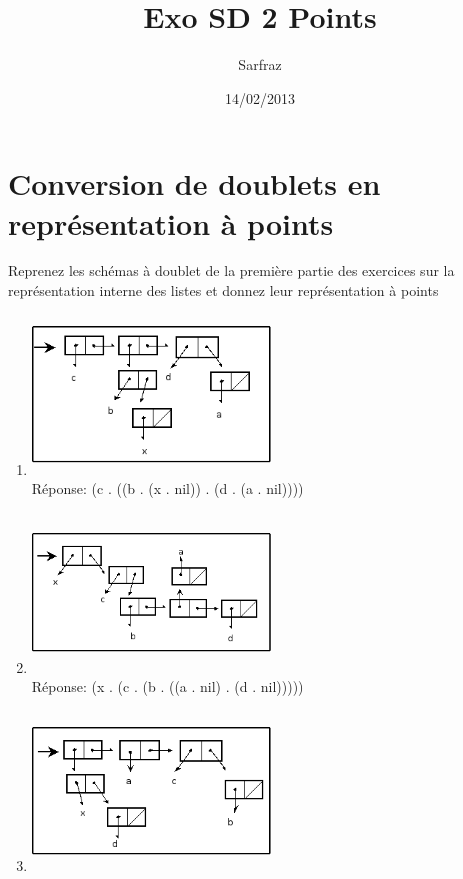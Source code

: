 \documentclass[a4paper, 11pt]{article}
\title{Exo SD 2 Points}
\author{Sarfraz \bsc{kapasi}}
\date{14/02/2013}
\begin{document}
%
\maketitle
%
\section{Conversion de doublets en représentation à points}

Reprenez les schémas à doublet de la première partie des exercices sur la représentation interne des listes et donnez leur représentation à points\\

\begin{enumerate}
  \item \includegraphics[height=120pt, width=180pt]{Pointeurs_Exo1.png}\\
Réponse: (c . ((b . (x . nil)) . (d . (a . nil))))
  \item \includegraphics[height=120pt, width=180pt]{Pointeurs_Exo2.png}\\
Réponse: (x . (c . (b . ((a . nil) . (d . nil)))))
  \item \includegraphics[height=120pt, width=180pt]{Pointeurs_Exo3.png}\\

\end{enumerate}
\end{document}
